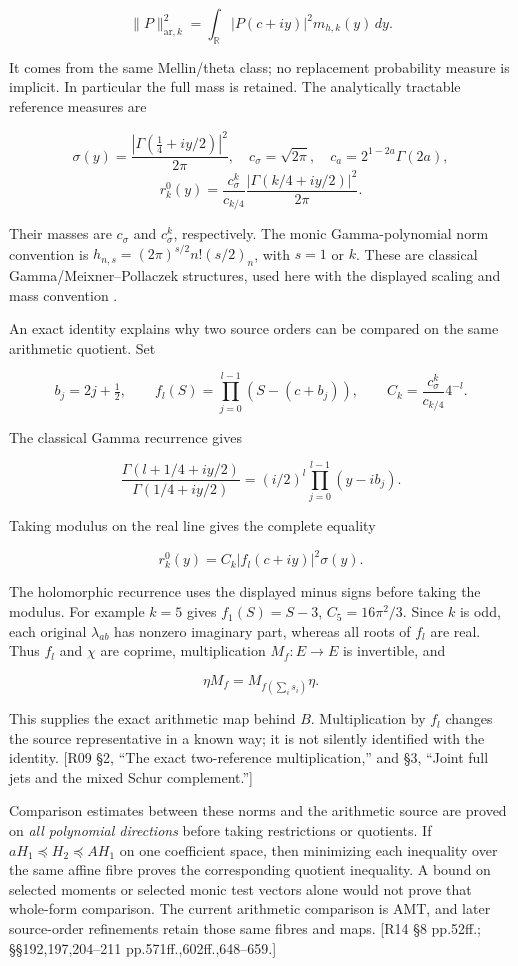 \[
\|P\|_{\mathrm{ar},k}^2
=\int_{\mathbb R}|P(c+iy)|^2m_{h,k}(y)\,dy.
\]

It comes from the same Mellin/theta class; no replacement probability measure is implicit. In particular the full mass is retained. The analytically tractable reference measures are

\[
\sigma(y)=\frac{|\Gamma(\tfrac14+iy/2)|^2}{2\pi},
\quad c_\sigma=\sqrt{2\pi},\quad
c_a=2^{1-2a}\Gamma(2a),
\] \[
r_k^0(y)=\frac{c_\sigma^k}{c_{k/4}}
          \frac{|\Gamma(k/4+iy/2)|^2}{2\pi}.
\]

Their masses are \(c_\sigma\) and \(c_\sigma^k\), respectively. The monic Gamma-polynomial norm convention is \(h_{n,s}=(2\pi)^{s/2}n!(s/2)_n\), with \(s=1\) or \(k\). These are classical Gamma/Meixner--Pollaczek structures, used here with the displayed scaling and mass convention \cite{DLMF18Current,KoekoekLeskySwarttouw2010}.

An exact identity explains why two source orders can be compared on the same arithmetic quotient. Set

\[
b_j=2j+\tfrac12,\qquad
f_l(S)=\prod_{j=0}^{l-1}(S-(c+b_j)),\qquad
C_k=\frac{c_\sigma^k}{c_{k/4}}4^{-l}.
\]

The classical Gamma recurrence \cite{DLMF5Current} gives

\[
\frac{\Gamma(l+1/4+iy/2)}{\Gamma(1/4+iy/2)}
=(i/2)^l\prod_{j=0}^{l-1}(y-ib_j).
\]

Taking modulus on the real line gives the complete equality

\[
r_k^0(y)=C_k|f_l(c+iy)|^2\sigma(y).
\tag{B}
\]

The holomorphic recurrence uses the displayed minus signs before taking the modulus. For example \(k=5\) gives \(f_1(S)=S-3\), \(C_5=16\pi^2/3\). Since \(k\) is odd, each original \(\lambda_{ab}\) has nonzero imaginary part, whereas all roots of \(f_l\) are real. Thus \(f_l\) and \(\chi\) are coprime, multiplication \(M_f:E\to E\) is invertible, and

\[
\eta M_f=M_{f(\sum_i s_i)}\eta.
\]

This supplies the exact arithmetic map behind \(B\). Multiplication by \(f_l\) changes the source representative in a known way; it is not silently identified with the identity. {[}R09 §2, ``The exact two-reference multiplication,'' and §3, ``Joint full jets and the mixed Schur complement.''{]}

Comparison estimates between these norms and the arithmetic source are proved on \emph{all polynomial directions} before taking restrictions or quotients. If \(aH_1\preceq H_2\preceq AH_1\) on one coefficient space, then minimizing each inequality over the same affine fibre proves the corresponding quotient inequality. A bound on selected moments or selected monic test vectors alone would not prove that whole-form comparison. The current arithmetic comparison is AMT, and later source-order refinements retain those same fibres and maps. {[}R14 §8 pp.52ff.; §§192,197,204--211 pp.571ff.,602ff.,648--659.{]}

